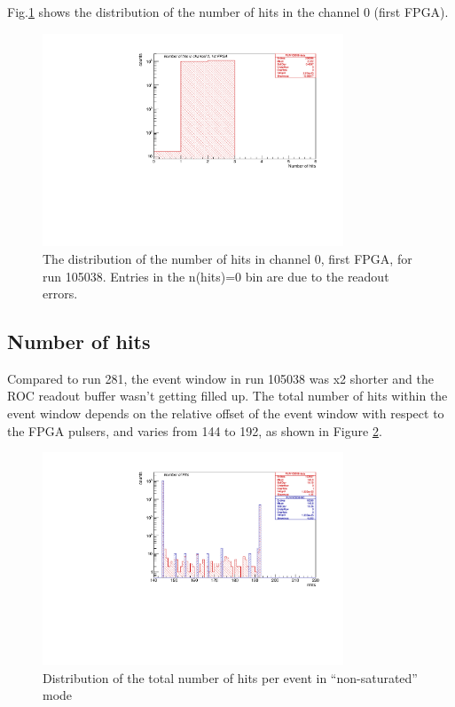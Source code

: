 Fig.\ref{fig:67} shows the distribution of the number of hits in the channel 0 (first FPGA).
\begin{figure}[H]
\centering
\includegraphics[width =0.8\textwidth]{figures/pdf/figure_00067_nhits_ch00_run105038.pdf}
\caption{
  The distribution of the number of hits in channel 0, first FPGA, for run 105038.
  Entries in the n(hits)=0 bin are due to the readout errors.
}
\label{fig:67}
\end{figure}

\subsection{Number of hits}
Compared to run 281, the event window in run 105038 was x2 shorter
and the ROC readout buffer wasn't getting filled up.
The total number of hits within the event window depends on the relative offset
of the event window with respect to the FPGA pulsers, and varies from
144 to 192, as shown in Figure \ref{fig:6}.

\begin{figure}[!h]
\centering
\includegraphics[width =0.8\textwidth]{figures/pdf/figure_00009_nhits_105038}
\caption{
  Distribution of the total number of hits per event in ``non-saturated'' mode
}
\label{fig:6}
\end{figure}










